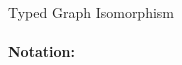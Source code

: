 \begin{definition}{Typed Graph Isomorphism\\}
\label{def:typed_graph_isomorphism_appendix}
\end{definition}

\paragraph{\textbf{Notation:}}

\clearpage

